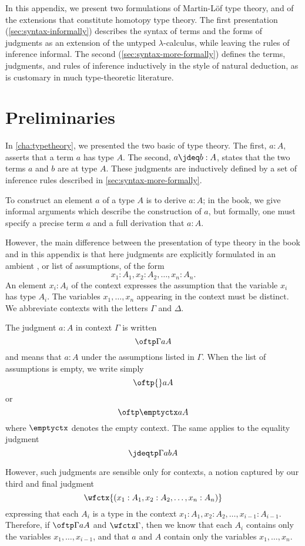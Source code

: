 In this appendix, we present two formulations of Martin-L\"{o}f type
theory, and of the extensions that constitute homotopy type theory.
The first presentation (\autoref{sec:syntax-informally}) describes the syntax of
terms and the forms of judgments as an extension of the untyped
$\lambda$-calculus, while leaving the rules of inference informal.
The second (\autoref{sec:syntax-more-formally}) defines the terms, judgments,
and rules of inference inductively in the style of natural deduction, as
is customary in much type-theoretic literature.

\section*{Preliminaries}
\label{sec:formal-prelim}


In \autoref{cha:typetheory}, we presented the two basic 
of type theory. The first, $a:A$, asserts that a term $a$ has type $A$. The second,
$a\jdeq b:A$, states that the two terms $a$ and $b$ are 
at type $A$. These judgments are inductively defined by a set of
inference rules described in \autoref{sec:syntax-more-formally}.

To construct an element $a$ of a type $A$ is to derive $a:A$; in the book, we
give informal arguments which describe the construction of $a$, but formally,
one must specify a precise term $a$ and a full derivation that $a:A$.

However, the main difference between the presentation of type theory in the book
and in this appendix is that here judgments are explicitly
formulated in an ambient ,
or list of assumptions, of the form
\[
  x_1:A_1, x_2:A_2,\dots,x_n:A_n.
\]
An element $x_i : A_i$ of the context expresses the assumption that the
variable
%
$x_i$ has type $A_i$. The variables $x_1, \ldots, x_n$ appearing in
the context must be distinct. We abbreviate contexts with the letters $\Gamma$
and $\Delta$.

The judgment $a:A$ in context $\Gamma$ is written 
\[ \oftp\Gamma aA \]
and means that $a:A$ under the assumptions listed in $\Gamma$. When the list of
assumptions is empty, we write simply
\[ \oftp{}aA \]
or
\[ \oftp\emptyctx aA \]
where $\emptyctx$ denotes the empty context. The same applies to the equality
judgment
\[
  \jdeqtp\Gamma{a}{b}{A}
\]

However, such judgments are sensible only for  contexts,
%
a notion captured by our third and final judgment
\[
  \wfctx{(x_1:A_1, x_2:A_2,\dots,x_n:A_n)}
\]
expressing that each $A_i$ is a type in the context $x_1:A_1,
x_2:A_2,\dots,x_{i-1}:A_{i-1}$. Therefore, if $\oftp\Gamma aA$ and
$\wfctx\Gamma$, then we know that each $A_i$ contains only the variables
$x_1,\dots,x_{i-1}$, and that $a$ and $A$ contain only the variables
$x_1,\dots,x_n$.

